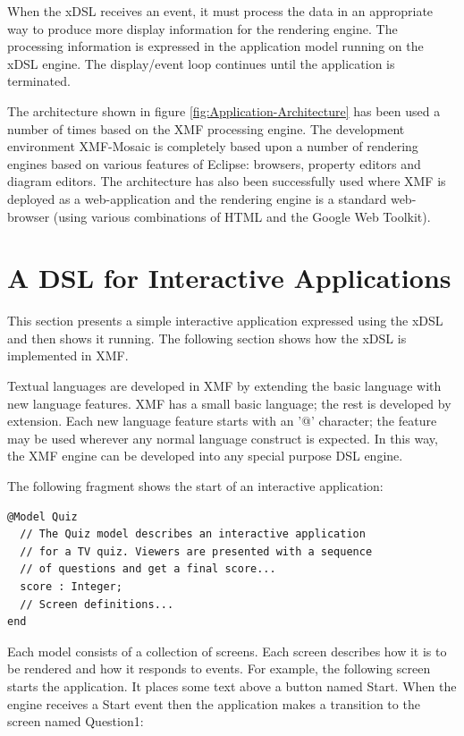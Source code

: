 When the xDSL receives an event, it must process the data in an appropriate
way to produce more display information for the rendering engine.
The processing information is expressed in the application model running
on the xDSL engine. The display/event loop continues until the application
is terminated.

The architecture shown in figure \ref{fig:Application-Architecture}
has been used a number of times based on the XMF processing engine.
The development environment XMF-Mosaic is completely based upon a
number of rendering engines based on various features of Eclipse:
browsers, property editors and diagram editors. The architecture has
also been successfully used where XMF is deployed as a web-application
and the rendering engine is a standard web-browser (using various
combinations of HTML and the Google Web Toolkit).


\section{A DSL for Interactive Applications\label{sec:A-DSL-for-Interactive-Applications}}

This section presents a simple interactive application expressed using
the xDSL and then shows it running. The following section shows how
the xDSL is implemented in XMF.

Textual languages are developed in XMF by extending the basic language
with new language features. XMF has a small basic language; the rest
is developed by extension. Each new language feature starts with an
'@' character; the feature may be used wherever any normal language
construct is expected. In this way, the XMF engine can be developed
into any special purpose DSL engine.

\newpage{}

The following fragment shows the start of an interactive application:

\begin{lstlisting}
@Model Quiz
  // The Quiz model describes an interactive application
  // for a TV quiz. Viewers are presented with a sequence
  // of questions and get a final score...
  score : Integer;
  // Screen definitions...
end
\end{lstlisting}Each model consists of a collection of screens. Each screen describes
how it is to be rendered and how it responds to events. For example,
the following screen starts the application. It places some text above
a button named Start. When the engine receives a Start event then
the application makes a transition to the screen named Question1:

